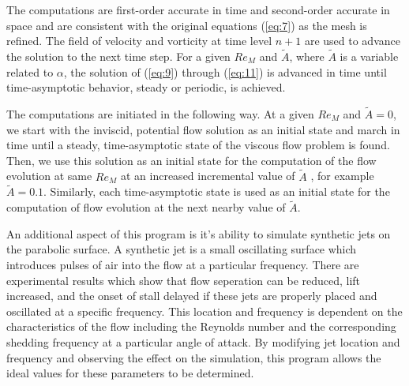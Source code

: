 \documentclass{article}
\begin{document}
The computations are first-order accurate in time and second-order accurate in space and are consistent with the original equations (\ref{eq:7}) as the mesh is refined. The field of velocity and vorticity at time level $n+1$ are used to advance the solution to the next time step. For a given $Re_M$ and $\tilde{A}$, where $\tilde{A}$ is a variable related to $\alpha$, the solution of (\ref{eq:9}) through (\ref{eq:11}) is advanced in time until time-asymptotic behavior, steady or periodic, is achieved.

The computations are initiated in the following way. At a given $Re_M$ and $\tilde{A} = 0$, we start with the inviscid, potential flow solution as an initial state and march in time until a steady, time-asymptotic state of the viscous flow problem is found. Then, we use this solution as an initial state for the computation of the flow evolution at same $Re_M$ at an increased incremental value of $\tilde{A}$ , for example $\tilde{A} = 0.1$. Similarly, each time-asymptotic state is used as an initial state for the computation of flow evolution at the next nearby value of $\tilde{A}$.

An additional aspect of this program is it's ability to simulate synthetic jets on the parabolic surface. A synthetic jet is a small oscillating surface which introduces pulses of air into the flow at a particular frequency. There are experimental results which show that flow seperation can be reduced, lift increased, and the onset of stall delayed if these jets are properly placed and oscillated at a specific frequency. This location and frequency is dependent on the characteristics of the flow including the Reynolds number and the corresponding shedding frequency at a particular angle of attack. By modifying jet location and frequency and observing the effect on the simulation, this program allows the ideal values for these parameters to be determined.
\end{document}
